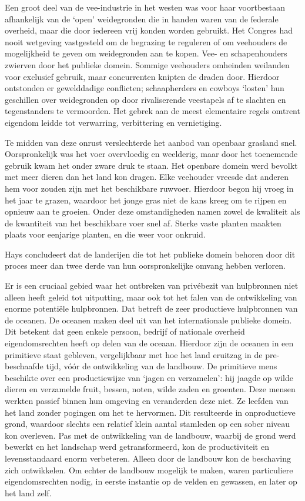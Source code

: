 \documentclass[
  a5paper,
  smalldemyvopaper,10pt,twoside,onecolumn,openright,extrafontsizes,hidelinks]{memoir}
\renewenvironment{quote}%
               {\list{}{\rightmargin=.6cm\leftmargin=.6cm}%
                \itshape \item[]}%
               {\endlist}
\begin{document}
\begin{quote}
Een groot deel van de vee-industrie in het westen was voor haar
voortbestaan afhankelijk van de `open' weidegronden die in handen waren
van de federale overheid, maar die door iedereen vrij konden worden
gebruikt. Het Congres had nooit wetgeving vastgesteld om de begrazing te
reguleren of om veehouders de mogelijkheid te geven om weidegronden aan
te kopen. Vee- en schapenhouders zwierven door het publieke domein.
Sommige veehouders omheinden weilanden voor exclusief gebruik, maar
concurrenten knipten de draden door. Hierdoor ontstonden er gewelddadige
conflicten; schaapherders en cowboys `losten' hun geschillen over
weidegronden op door rivaliserende veestapels af te slachten en
tegenstanders te vermoorden. Het gebrek aan de meest elementaire regels
omtrent eigendom leidde tot verwarring, verbittering en vernietiging.

Te midden van deze onrust verslechterde het aanbod van openbaar grasland
snel. Oorspronkelijk was het voer overvloedig en weelderig, maar door
het toenemende gebruik kwam het onder zware druk te staan. Het openbare
domein werd bevolkt met meer dieren dan het land kon dragen. Elke
veehouder vreesde dat anderen hem voor zouden zijn met het beschikbare
ruwvoer. Hierdoor begon hij vroeg in het jaar te grazen, waardoor het
jonge gras niet de kans kreeg om te rijpen en opnieuw aan te groeien.
Onder deze omstandigheden namen zowel de kwaliteit als de kwantiteit van
het beschikbare voer snel af. Sterke vaste planten maakten plaats voor
eenjarige planten, en die weer voor onkruid.
\end{quote}

Hays concludeert dat de landerijen die tot het publieke domein behoren
door dit proces meer dan twee derde van hun oorspronkelijke omvang
hebben verloren.

Er is een cruciaal gebied waar het ontbreken van privébezit van
hulpbronnen niet alleen heeft geleid tot uitputting, maar ook tot het
falen van de ontwikkeling van enorme potentiële hulpbronnen. Dat betreft
de zeer productieve hulpbronnen van de oceanen. De oceanen maken deel
uit van het internationale publieke domein. Dit betekent dat geen enkele
persoon, bedrijf of nationale overheid eigendomsrechten heeft op delen
van de oceaan. Hierdoor zijn de oceanen in een primitieve staat
gebleven, vergelijkbaar met hoe het land eruitzag in de pre-beschaafde
tijd, vóór de ontwikkeling van de landbouw. De primitieve mens beschikte
over een productiewijze van `jagen en verzamelen': hij jaagde op wilde
dieren en verzamelde fruit, bessen, noten, wilde zaden en groenten. Deze
mensen werkten passief binnen hun omgeving en veranderden deze niet. Ze
leefden van het land zonder pogingen om het te hervormen. Dit
resulteerde in onproductieve grond, waardoor slechts een relatief klein
aantal stamleden op een sober niveau kon overleven. Pas met de
ontwikkeling van de landbouw, waarbij de grond werd bewerkt en het
landschap werd getransformeerd, kon de productiviteit en levensstandaard
enorm verbeteren. Alleen door de landbouw kon de beschaving zich
ontwikkelen. Om echter de landbouw mogelijk te maken, waren particuliere
eigendomsrechten nodig, in eerste instantie op de velden en gewassen, en
later op het land zelf.
\end{document}
